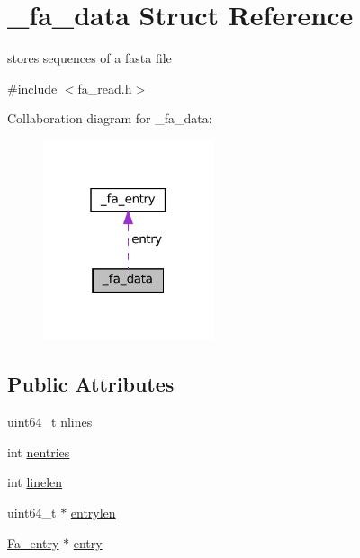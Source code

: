 \hypertarget{struct__fa__data}{}\section{\+\_\+fa\+\_\+data Struct Reference}
\label{struct__fa__data}


stores sequences of a fasta file  




{\ttfamily \#include $<$fa\+\_\+read.\+h$>$}



Collaboration diagram for \+\_\+fa\+\_\+data\+:
\nopagebreak
\begin{figure}[H]
\begin{center}
\leavevmode
\includegraphics[width=142pt]{struct__fa__data__coll__graph}
\end{center}
\end{figure}
\subsection*{Public Attributes}
\begin{DoxyCompactItemize}
\item 
uint64\+\_\+t \mbox{\hyperlink{struct__fa__data_a49ac64b09307f73104bbf1e650f3c2c5}{nlines}}
\item 
int \mbox{\hyperlink{struct__fa__data_a2e49d8da3a888d7df62cd887367e2923}{nentries}}
\item 
int \mbox{\hyperlink{struct__fa__data_a3607f37f43d8b2f14ced6a93c6a444ff}{linelen}}
\item 
uint64\+\_\+t $\ast$ \mbox{\hyperlink{struct__fa__data_acdb54c828a0fbfe8b8851f5290afc16e}{entrylen}}
\item 
\mbox{\hyperlink{fa__read_8h_a8f68b28ad3a6c33fe1dd78d5ac044b30}{Fa\+\_\+entry}} $\ast$ \mbox{\hyperlink{struct__fa__data_a3c2c4488c834a828085df7b409d292e4}{entry}}
\end{DoxyCompactItemize}


